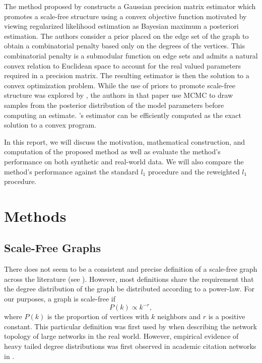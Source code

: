 \documentclass{uwstat572}
\theoremstyle{remark}
\theoremstyle{definition}
\begin{document}
The method proposed by \cite{Defazio2012} constructs a Gaussian precision matrix estimator which promotes a scale-free structure using a convex objective function motivated by viewing regularized likelihood estimation as Bayesian maximum a posteriori estimation.  
The authors consider a prior placed on the edge set of the graph to obtain a combinatorial penalty based only on the degrees of the vertices. This combinatorial penalty is a submodular function on edge sets and admits a natural convex relation to Euclidean space to account for the real valued parameters required in a precision matrix. The resulting estimator is then the solution to a convex optimization problem. While the use of priors to promote scale-free structure was explored by \cite{sheridan2010}, the authors in that paper use MCMC to draw samples from the posterior distribution of the model parameters before computing an estimate.  \citet{Defazio2012}'s estimator can be efficiently computed as the exact solution to a convex program.

In this report, we will discuss the motivation, mathematical construction, and computation of the proposed method as well as evaluate the method's performance on both synthetic and real-world data.  We will also compare the method's performance against the standard $l_1$ procedure and the reweighted $l_1$ procedure.  

\section{Methods}

\subsection{Scale-Free Graphs}

There does not seem to be a consistent and precise definition of a scale-free graph across the literature (see \citep{li2005}).  However, most definitions share the requirement that the degree distribution of the graph be distributed according to a power-law. For our purposes, a graph is scale-free if 
\begin{equation}\label{powerlaw}
P(k) \propto k^{-r},
\end{equation}
where $P(k)$ is the proportion of vertices with $k$ neighbors and $r$ is a positive constant.  This particular definition was first used by \cite{Barabasi99} when describing the network topology of large networks in the real world.  However, empirical evidence of heavy tailed degree distributions was first observed in academic citation networks in \citep{de1965networks}.
\end{document}
